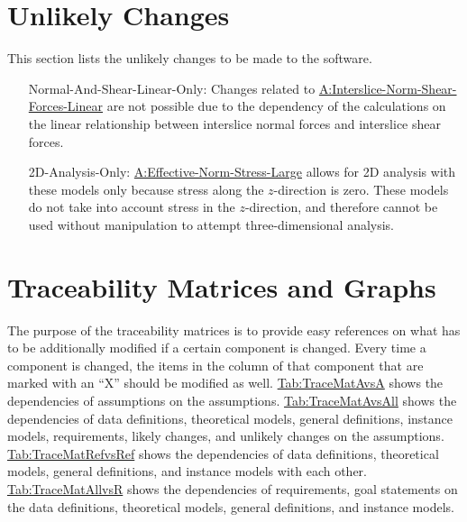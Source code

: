 \documentclass[12pt]{article}
\begin{document}
\section{Unlikely Changes}
\label{Sec:UCs}
This section lists the unlikely changes to be made to the software.

\begin{itemize}
\item[Normal-And-Shear-Linear-Only:\phantomsection\label{UC_normshearlinear}]{Changes related to \hyperref[assumpINSFL]{A:Interslice-Norm-Shear-Forces-Linear} are not possible due to the dependency of the calculations on the linear relationship between interslice normal forces and interslice shear forces.}
\item[2D-Analysis-Only:\phantomsection\label{UC_2donly}]{\hyperref[assumpENSL]{A:Effective-Norm-Stress-Large} allows for 2D analysis with these models only because stress along the $z$-direction is zero. These models do not take into account stress in the $z$-direction, and therefore cannot be used without manipulation to attempt three-dimensional analysis.}
\end{itemize}
\section{Traceability Matrices and Graphs}
\label{Sec:TraceMatrices}
The purpose of the traceability matrices is to provide easy references on what has to be additionally modified if a certain component is changed. Every time a component is changed, the items in the column of that component that are marked with an ``X'' should be modified as well. \hyperref[Table:TraceMatAvsA]{Tab:TraceMatAvsA} shows the dependencies of assumptions on the assumptions. \hyperref[Table:TraceMatAvsAll]{Tab:TraceMatAvsAll} shows the dependencies of data definitions, theoretical models, general definitions, instance models, requirements, likely changes, and unlikely changes on the assumptions. \hyperref[Table:TraceMatRefvsRef]{Tab:TraceMatRefvsRef} shows the dependencies of data definitions, theoretical models, general definitions, and instance models with each other. \hyperref[Table:TraceMatAllvsR]{Tab:TraceMatAllvsR} shows the dependencies of requirements, goal statements on the data definitions, theoretical models, general definitions, and instance models.
\end{document}

